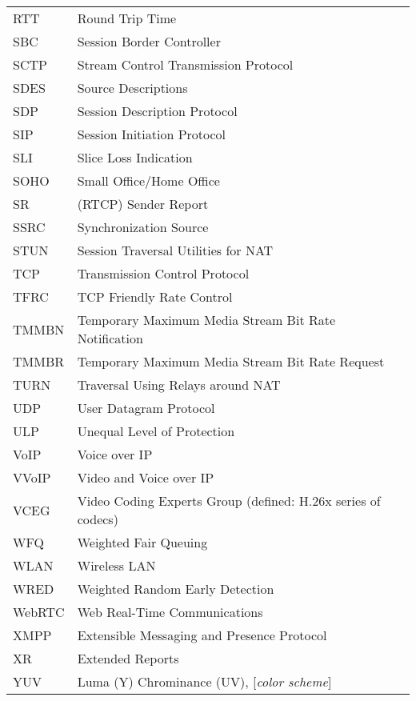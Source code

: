 \begin{longtable}{ll}
RTT 	& Round Trip Time \\
SBC  	& Session Border Controller \\
SCTP 	& Stream Control Transmission Protocol  \\
SDES	& Source Descriptions \\
SDP 	& Session Description Protocol \\
SIP 	& Session Initiation Protocol \\
SLI 	& Slice Loss Indication \\
SOHO 	& Small Office/Home Office \\
SR  	& (RTCP) Sender Report \\
SSRC	& Synchronization Source \\
STUN  	& Session Traversal Utilities for NAT \\
TCP 	& Transmission Control Protocol \\
TFRC 	& TCP Friendly Rate Control \\
TMMBN 	& Temporary Maximum Media Stream Bit Rate Notification \\
TMMBR 	& Temporary Maximum Media Stream Bit Rate Request \\
TURN  	& Traversal Using Relays around NAT \\
UDP 	& User Datagram Protocol \\
ULP 	& Unequal Level of Protection \\
VoIP 	& Voice over IP \\
VVoIP	& Video and Voice over IP \\
VCEG 	& Video Coding Experts Group (defined: H.26x series of codecs)\\
WFQ 	& Weighted Fair Queuing \\
WLAN	& Wireless LAN \\
WRED 	& Weighted Random Early Detection \\
WebRTC	& Web Real-Time Communications \\
XMPP 	& Extensible Messaging and Presence Protocol \\
XR  	& Extended Reports \\
YUV 	& Luma (Y) Chrominance (UV), [\textit{color scheme}] \\
\end{longtable}
